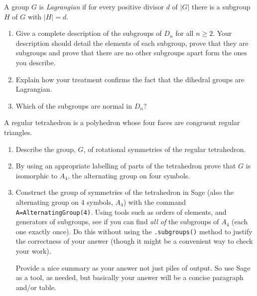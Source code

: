 \documentclass[oneside,10pt]{amsart}
\begin{document}
\noindent
A group $G$ is \emph{Lagrangian} if for every positive divisor $d$ of $|G|$ there is a subgroup $H$ of $G$ with $|H| = d$.
\begin{enumerate}[label=(\alph*)]
\item
Give a complete description of the subgroups of $D_n$ for all $n \geq 2$. Your description should detail the elements of each subgroup, prove that they are subgroups and prove that there are no other subgroups apart form the ones you describe.
\item
Explain how your treatment confirms the fact that the dihedral groups are Lagrangian.
\item
Which of the subgroups are normal in $D_n$?
\end{enumerate}
A regular tetrahedron is a polyhedron whose four faces are congruent regular triangles.
\begin{enumerate}[label=(\alph*)]
\item
Describe the group, $G$, of rotational symmetries of the regular tetrahedron.
\item
By using an appropriate labelling of parts of the tetrahedron prove that $G$ is isomorphic to $A_4$, the alternating group on four symbols.
\item
Construct the group of symmetries of the tetrahedron in Sage (also the alternating group on 4 symbols, \(A_4\)) with the command \texttt{A=AlternatingGroup(4)}.  Using tools such as orders of elements, and generators of subgroups, see if you can find \emph{all of} the subgroups of \(A_4\) (each one exactly once).  Do this without using the \texttt{.subgroups()} method to justify the correctness of your answer (though it might be a convenient way to check your work).%
\par
Provide a nice summary as your answer \textemdash{} not just piles of output.  So use Sage as a tool, as needed, but basically your answer will be a concise paragraph and/or table.
\end{enumerate}
\end{document}
